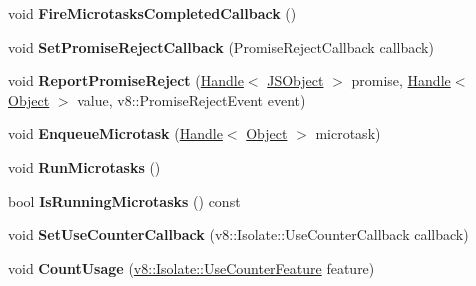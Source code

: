 \begin{DoxyCompactItemize}
\item 
void {\bfseries Fire\+Microtasks\+Completed\+Callback} ()\hypertarget{classv8_1_1internal_1_1_isolate_ae3a4c8a45a864f1c33fd652224fdb37a}{}\label{classv8_1_1internal_1_1_isolate_ae3a4c8a45a864f1c33fd652224fdb37a}

\item 
void {\bfseries Set\+Promise\+Reject\+Callback} (Promise\+Reject\+Callback callback)\hypertarget{classv8_1_1internal_1_1_isolate_a2d5bb799239417dc1105974638157f21}{}\label{classv8_1_1internal_1_1_isolate_a2d5bb799239417dc1105974638157f21}

\item 
void {\bfseries Report\+Promise\+Reject} (\hyperlink{classv8_1_1internal_1_1_handle}{Handle}$<$ \hyperlink{classv8_1_1internal_1_1_j_s_object}{J\+S\+Object} $>$ promise, \hyperlink{classv8_1_1internal_1_1_handle}{Handle}$<$ \hyperlink{classv8_1_1internal_1_1_object}{Object} $>$ value, v8\+::\+Promise\+Reject\+Event event)\hypertarget{classv8_1_1internal_1_1_isolate_a2367e649e914e2db62b34152ed03b60d}{}\label{classv8_1_1internal_1_1_isolate_a2367e649e914e2db62b34152ed03b60d}

\item 
void {\bfseries Enqueue\+Microtask} (\hyperlink{classv8_1_1internal_1_1_handle}{Handle}$<$ \hyperlink{classv8_1_1internal_1_1_object}{Object} $>$ microtask)\hypertarget{classv8_1_1internal_1_1_isolate_a355acef471c0f83c18eae394a7cbca77}{}\label{classv8_1_1internal_1_1_isolate_a355acef471c0f83c18eae394a7cbca77}

\item 
void {\bfseries Run\+Microtasks} ()\hypertarget{classv8_1_1internal_1_1_isolate_a955f88ef2775d35d39f8fe1c4f441d54}{}\label{classv8_1_1internal_1_1_isolate_a955f88ef2775d35d39f8fe1c4f441d54}

\item 
bool {\bfseries Is\+Running\+Microtasks} () const \hypertarget{classv8_1_1internal_1_1_isolate_aeea0ff5a263068a60e3e956de685cf76}{}\label{classv8_1_1internal_1_1_isolate_aeea0ff5a263068a60e3e956de685cf76}

\item 
void {\bfseries Set\+Use\+Counter\+Callback} (v8\+::\+Isolate\+::\+Use\+Counter\+Callback callback)\hypertarget{classv8_1_1internal_1_1_isolate_a774d9acf270e7e3145c40bb081413135}{}\label{classv8_1_1internal_1_1_isolate_a774d9acf270e7e3145c40bb081413135}

\item 
void {\bfseries Count\+Usage} (\hyperlink{classv8_1_1_isolate_aed6909379c3f2820cb3084710b73385d}{v8\+::\+Isolate\+::\+Use\+Counter\+Feature} feature)\hypertarget{classv8_1_1internal_1_1_isolate_a2fbd063d0fbd9a69e5e5adebceefddf1}{}\label{classv8_1_1internal_1_1_isolate_a2fbd063d0fbd9a69e5e5adebceefddf1}


\end{DoxyCompactItemize}
